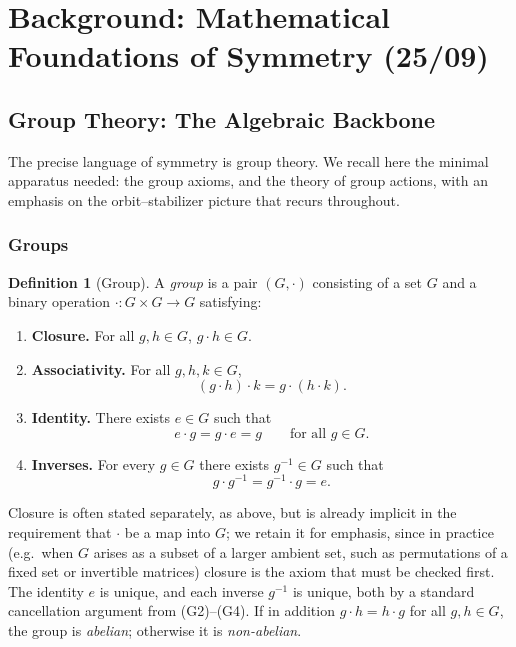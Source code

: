 \documentclass[11pt]{article}
\theoremstyle{plain}
\theoremstyle{definition}
\newtheorem{Definition}{Definition}[section]
\begin{document}
\section{Background: Mathematical Foundations of Symmetry (25/09)}\label{sec:background}
\subsection{Group Theory: The Algebraic Backbone}
\label{sec:group-theory-backbone}

The precise language of symmetry is group theory.
We recall here the minimal apparatus needed: the group axioms, and the theory of group actions, with an emphasis on the orbit--stabilizer picture that recurs throughout.

\subsubsection{Groups}\label{subsec:groups}

\begin{Definition}[Group]\label{def:group}
A \emph{group} is a pair $(G, \cdot)$ consisting of a set $G$ and a binary
operation $\cdot : G \times G \to G$ satisfying:
    \begin{enumerate}[label=(G\arabic*), leftmargin=*, labelsep=0.5em]
        \item \textbf{Closure.} For all $g, h \in G$, $g \cdot h \in G$.
        \item \textbf{Associativity.} For all $g, h, k \in G$,
        \[
            (g \cdot h) \cdot k = g \cdot (h \cdot k).
        \]
        \item \textbf{Identity.} There exists $e \in G$ such that
        \[
            e \cdot g = g \cdot e = g \qquad \text{for all } g \in G.
        \]
        \item \textbf{Inverses.} For every $g \in G$ there exists
        $g^{-1} \in G$ such that
        \[
            g \cdot g^{-1} = g^{-1} \cdot g = e.
        \]
    \end{enumerate}
\end{Definition}

Closure is often stated separately, as above, but is already implicit in the
requirement that $\cdot$ be a map into $G$; we retain it for emphasis, since
in practice (e.g.\ when $G$ arises as a subset of a larger ambient set, such
as permutations of a fixed set or invertible matrices) closure is the axiom
that must be checked first. The identity $e$ is unique, and each inverse
$g^{-1}$ is unique, both by a standard cancellation argument from (G2)--(G4).
If in addition $g \cdot h = h \cdot g$ for all $g,h \in G$, the group is
\emph{abelian}; otherwise it is \emph{non-abelian}.
\end{document}
